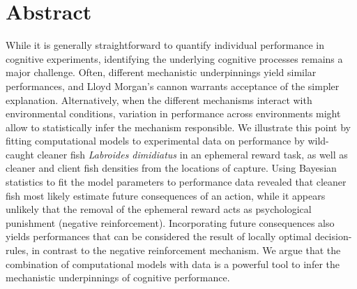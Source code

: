 \documentclass[10pt,letterpaper]{article}
\newcommand{\getIndex}[2]{
  \ForEach{,}{\IfEq{#1}{\thislevelitem}{\number\thislevelcount\ExitForEach}{}}{#2}
}
\newcommand{\getAff}[1]{
  \getIndex{#1}{Institute of Biology, University of Neuchatel,Department
of Zoology, Stockholm University}
}
\begin{document}
\vspace*{0.2in}


\section*{Abstract}
While it is generally straightforward to quantify individual performance
in cognitive experiments, identifying the underlying cognitive processes
remains a major challenge. Often, different mechanistic underpinnings
yield similar performances, and Lloyd Morgan's cannon warrants
acceptance of the simpler explanation. Alternatively, when the different
mechanisms interact with environmental conditions, variation in
performance across environments might allow to statistically infer the
mechanism responsible. We illustrate this point by fitting computational
models to experimental data on performance by wild-caught cleaner fish
\emph{Labroides dimidiatus} in an ephemeral reward task, as well as
cleaner and client fish densities from the locations of capture. Using
Bayesian statistics to fit the model parameters to performance data
revealed that cleaner fish most likely estimate future consequences of
an action, while it appears unlikely that the removal of the ephemeral
reward acts as psychological punishment (negative reinforcement).
Incorporating future consequences also yields performances that can be
considered the result of locally optimal decision-rules, in contrast to
the negative reinforcement mechanism. We argue that the combination of
computational models with data is a powerful tool to infer the
mechanistic underpinnings of cognitive performance.
\end{document}
